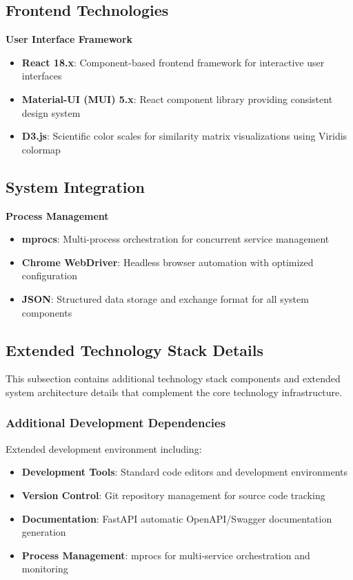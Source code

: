 \subsection{Frontend Technologies}
\label{subsec:frontend-technologies}

\textbf{User Interface Framework}
\begin{itemize}
    \item \textbf{React 18.x}: Component-based frontend framework for interactive user interfaces
    \item \textbf{Material-UI (MUI) 5.x}: React component library providing consistent design system
    \item \textbf{D3.js}: Scientific color scales for similarity matrix visualizations using Viridis colormap
\end{itemize}

\subsection{System Integration}
\label{subsec:system-integration}

\textbf{Process Management}
\begin{itemize}
    \item \textbf{mprocs}: Multi-process orchestration for concurrent service management
    \item \textbf{Chrome WebDriver}: Headless browser automation with optimized configuration
    \item \textbf{JSON}: Structured data storage and exchange format for all system components
\end{itemize}

\subsection{Extended Technology Stack Details}
\label{subsec:more-technology-stack}

This subsection contains additional technology stack components and extended system architecture details that complement the core technology infrastructure.

\subsubsection{Additional Development Dependencies}
Extended development environment including:
\begin{itemize}
    \item \textbf{Development Tools}: Standard code editors and development environments
    \item \textbf{Version Control}: Git repository management for source code tracking
    \item \textbf{Documentation}: FastAPI automatic OpenAPI/Swagger documentation generation
    \item \textbf{Process Management}: mprocs for multi-service orchestration and monitoring
\end{itemize}

